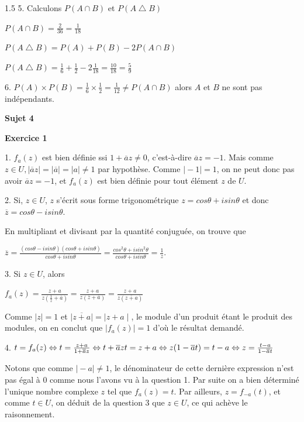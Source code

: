 \documentclass[12pt]{article}
\begin{document}
\begin{spacing}{1.5}
5. Calculons $P(A\cap B)$ et $P(A\bigtriangleup B)$

$P(A\cap B)=\frac{2}{36}=\frac{1}{18}$

$P(A\bigtriangleup B)=P(A)+P(B)-2P(A\cap B)$

$P(A\bigtriangleup B)=\frac{1}{6}+\frac{1}{2}-2\frac{1}{18}=\frac{10}{18}=\frac{5}{9}$

6. $P(A)\times P(B)=\frac{1}{6}\times \frac{1}{2}=\frac{1}{12}\neq P(A\cap B)$ alors $A$ et $B$ ne sont pas indépendants.

\medskip\textbf{Sujet 4}

\textbf{Exercice 1}

1. $f_a(z)$ est bien définie ssi $1+\overline{a}z\neq 0$, c'est-à-dire $\overline{a}z=-1$. Mais comme $z\in U,\mid\overline{a}z\mid =\mid\overline{a}\mid =\mid a \mid\neq 1$ par hypothèse. Comme $\mid -1\mid = 1$, on ne peut donc pas avoir $\overline{a}z =-1$, et $f_a(z)$ est bien définie pour tout élément $z$ de $U$.

2. Si, $z\in U$, $z$ s'écrit sous forme trigonométrique $z = cos\theta + isin\theta$ et donc $\overline{z}= cos\theta-isin\theta$.

En multipliant et divisant par la quantité conjuguée, on trouve que

$\overline{z}=\frac{(cos\theta - isin\theta)(cos\theta + isin\theta)}{cos\theta + isin\theta}=\frac{cos^2\theta + isin^2\theta}{cos\theta + isin\theta}=\frac{1}{z}$.

3. Si $z\in U$, alors

$f_a(z)=\frac{z+a}{z(\frac{1}{z}+\overline{a})}=\frac{z+a}{z(\overline{z}+\overline{a})}=\frac{z+a}{z(\overline{z+a})}$

Comme $\mid z\mid=1$ et $\mid \overline{z+a}\mid=\mid z+a\mid$, le module d'un produit étant le produit des modules, on
en conclut que $\mid f_a(z)\mid = 1$ d'où le résultat demandé. 

4. 
$
t=f_{a}(z) \Leftrightarrow t = \frac{ z + a}{1 + \overline{a} z } \\
           \Leftrightarrow t + \overline{a} z t = z + a \\
           \Leftrightarrow z (1 - \overline{a} t ) = t - a \\
           \Leftrightarrow z = \frac{t - a}{1 - \overline{a} t}
$

Notons que comme $\mid-a\mid\neq 1$, le dénominateur de cette dernière expression n'est pas égal
à 0 comme nous l'avons vu à la question 1. Par suite on a bien déterminé l'unique nombre
complexe $z$ tel que $f_a(z) = t$. Par ailleurs, $z = f_{-a}(t)$, et comme $t\in U$, on déduit de la
question 3 que $z\in U$, ce qui achève le raisonnement.


\end{spacing}
\end{document}

